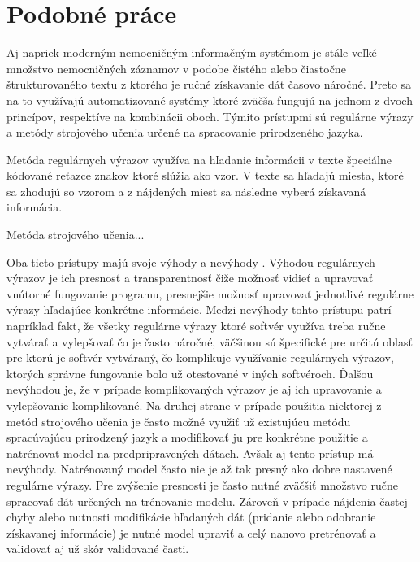 \chapter{Podobné práce}

Aj napriek moderným nemocničným informačným
systémom je stále veľké množstvo nemocničných záznamov v
podobe čistého alebo čiastočne štrukturovaného 
textu z ktorého je ručné získavanie dát časovo náročné.
Preto sa na to využívajú automatizované systémy
ktoré zväčša fungujú na jednom z dvoch princípov, 
respektíve na kombinácii oboch. Týmito prístupmi
sú regulárne výrazy a metódy strojového učenia
určené na spracovanie prirodzeného jazyka.

Metóda regulárnych výrazov využíva na hľadanie informácii v texte
špeciálne kódované reťazce znakov ktoré slúžia ako vzor. 
V texte sa hľadajú miesta, ktoré sa zhodujú so vzorom a z 
nájdených miest sa následne vyberá získavaná informácia.

Metóda strojového učenia...

Oba tieto prístupy majú svoje výhody a nevýhody \cite{nlpAndRegex}. 
Výhodou regulárnych výrazov je ich presnosť a 
transparentnosť čiže možnosť vidieť a upravovať
vnútorné fungovanie programu, presnejšie možnosť 
upravovať jednotlivé regulárne výrazy
hľadajúce konkrétne informácie. Medzi nevýhody tohto prístupu patrí
napríklad fakt, že všetky regulárne výrazy ktoré softvér využíva 
treba ručne vytvárať a vylepšovať
čo je často náročné, väčšinou sú špecifické pre určitú oblasť
pre ktorú je softvér vytváraný, čo komplikuje využívanie
regulárnych výrazov, ktorých správne fungovanie bolo už 
otestované v iných softvéroch. 
Ďalšou nevýhodou je, že v prípade komplikovaných výrazov je aj ich 
upravovanie a vylepšovanie komplikované. 
Na druhej strane v prípade použitia niektorej
z metód strojového učenia je často možné využiť už 
existujúcu metódu spracúvajúcu prirodzený jazyk a
modifikovať ju pre konkrétne použitie a natrénovať
model na predpripravených dátach. Avšak aj tento prístup
má nevýhody. Natrénovaný model často nie je až tak presný 
ako dobre nastavené regulárne výrazy. Pre zvýšenie presnosti je často nutné zväčšiť množstvo ručne spracovať dát určených na trénovanie modelu. Zároveň v prípade nájdenia častej chyby alebo nutnosti modifikácie hľadaných dát (pridanie alebo odobranie získavanej informácie) je nutné model upraviť a celý nanovo pretrénovať a validovať aj už skôr validované časti.

